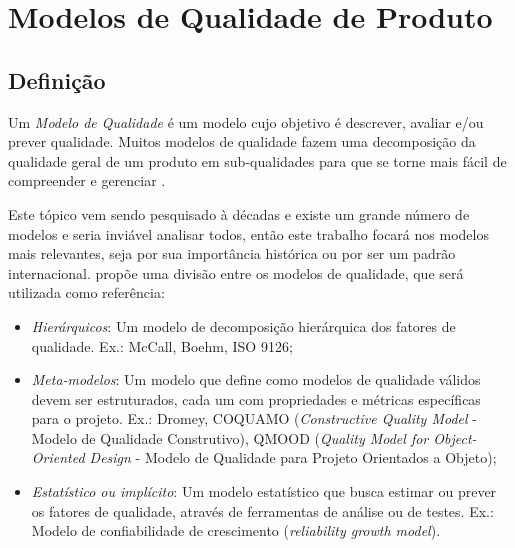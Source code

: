 \documentclass[
	12pt,				%
	openright,			%
	oneside,			%
	a4paper,			%
	english,			%
	brazil,				%
	]{abntex2}
\begin{document}
\chapter{Modelos de Qualidade de Produto}
\label{cap:modelos_qualidade}


\section{Definição}

Um \emph{Modelo de Qualidade} é um modelo cujo objetivo é descrever, avaliar e/ou prever qualidade. Muitos modelos de qualidade fazem uma decomposição da qualidade geral de um produto em sub-qualidades para que se torne mais fácil de compreender e gerenciar \cite{wagner2013}.

Este tópico vem sendo pesquisado à décadas e existe um grande número de modelos \cite{Klas2009} e seria inviável analisar todos, então este trabalho focará nos modelos mais relevantes, seja por sua importância histórica ou por ser um padrão internacional.  propõe uma divisão entre os modelos de qualidade, que será utilizada como referência:
\begin{itemize}
    \item \emph{Hierárquicos}: Um modelo de decomposição hierárquica dos fatores de qualidade. Ex.: McCall, Boehm, ISO 9126;
    \item \emph{Meta-modelos}: Um modelo que define como modelos de qualidade válidos devem ser estruturados, cada um com propriedades e métricas específicas para o projeto. Ex.: Dromey, COQUAMO (\emph{Constructive Quality Model} - Modelo de Qualidade Construtivo), QMOOD (\emph{Quality Model for Object-Oriented Design} - Modelo de Qualidade para Projeto Orientados a Objeto);
    \item \emph{Estatístico ou implícito}: Um modelo estatístico que busca estimar ou prever os fatores de qualidade, através de ferramentas de análise ou de testes. Ex.: Modelo de confiabilidade de crescimento (\emph{reliability growth model}).
\end{itemize}

\end{document}

